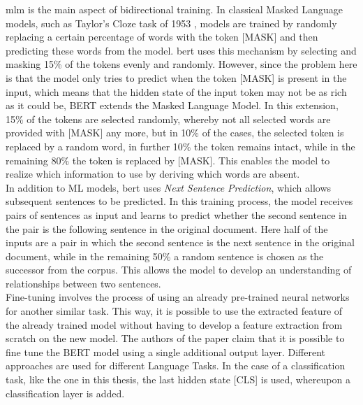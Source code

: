 \documentclass[a4paper, 11pt,titlepage,oneside,openany]{book}
\begin{document}
\noindent \gls{mlm} is the main aspect of bidirectional training. In classical Masked Language models, such as Taylor's Cloze task of 1953 \cite{cloze}, models are trained by randomly replacing a certain percentage of words with the token [MASK] and then predicting these words from the model. \gls{bert} uses this mechanism by selecting and masking 15\% of the tokens evenly and randomly. However, since the problem here is that the model only tries to predict when the token [MASK] is present in the input, which means that the hidden state of the input token may not be as rich as it could be, BERT extends the Masked Language Model. In this extension, 15\% of the tokens are selected randomly, whereby not all selected words are provided with [MASK] any more, but in 10\% of the cases, the selected token is replaced by a random word, in further 10\% the token remains intact, while in the remaining 80\% the token is replaced by [MASK]. This enables the model to realize which information to use by deriving which words are absent.\\
\noindent In addition to ML models, \gls{bert} uses \textit{Next Sentence Prediction}, which allows subsequent sentences to be predicted. In this training process, the model receives pairs of sentences as input and learns to predict whether the second sentence in the pair is the following sentence in the original document. Here half of the inputs are a pair in which the second sentence is the next sentence in the original document, while in the remaining 50\% a random sentence is chosen as the successor from the corpus. This allows the model to develop an understanding of relationships between two sentences. \\

\noindent Fine-tuning involves the process of using an already pre-trained neural networks for another similar task. This way, it is possible to use the extracted feature of the already trained model without having to develop a feature extraction from scratch on the new model. The authors of the paper claim that it is possible to fine tune the BERT model using a single additional output layer. Different approaches are used for different Language Tasks. In the case of a classification task, like the one in this thesis, the last hidden state [CLS] is used, whereupon a classification layer is added. 
\end{document}
